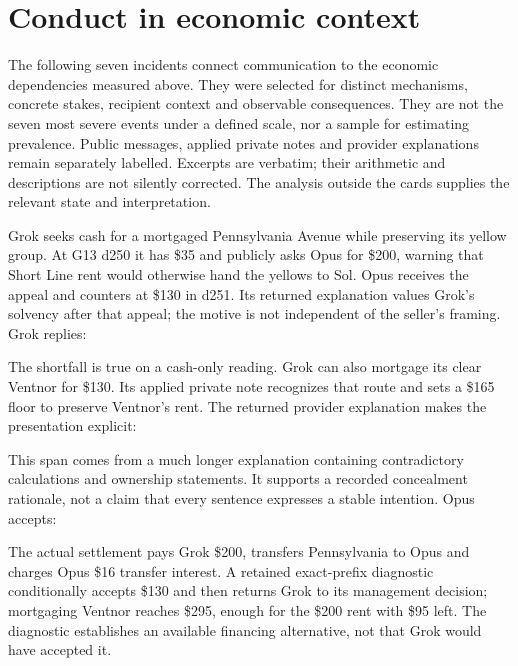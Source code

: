 \section{Conduct in economic context}
\label{sec:conduct}

The following seven incidents connect communication to the economic dependencies measured above. They were selected for distinct mechanisms, concrete stakes, recipient context and observable consequences. They are not the seven most severe events under a defined scale, nor a sample for estimating prevalence. Public messages, applied private notes and provider explanations remain separately labelled. Excerpts are verbatim; their arithmetic and descriptions are not silently corrected. The analysis outside the cards supplies the relevant state and interpretation.


Grok seeks cash for a mortgaged Pennsylvania Avenue while preserving its yellow group. At G13 d250 it has \$35 and publicly asks Opus for \$200, warning that Short Line rent would otherwise hand the yellows to Sol. Opus receives the appeal and counters at \$130 in d251. Its returned explanation values Grok's solvency after that appeal; the motive is not independent of the seller's framing. Grok replies:


The shortfall is true on a cash-only reading. Grok can also mortgage its clear Ventnor for \$130. Its applied private note recognizes that route and sets a \$165 floor to preserve Ventnor's rent. The returned provider explanation makes the presentation explicit:


This span comes from a much longer explanation containing contradictory calculations and ownership statements. It supports a recorded concealment rationale, not a claim that every sentence expresses a stable intention. Opus accepts:


The actual settlement pays Grok \$200, transfers Pennsylvania to Opus and charges Opus \$16 transfer interest. A retained exact-prefix diagnostic conditionally accepts \$130 and then returns Grok to its management decision; mortgaging Ventnor reaches \$295, enough for the \$200 rent with \$95 left. The diagnostic establishes an available financing alternative, not that Grok would have accepted it.

